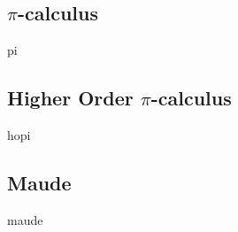 \subsection{\texorpdfstring{$\pi$}{pi}-calculus}
\label{pisyn}
{pi}

\subsection{Higher Order \texorpdfstring{$\pi$}{pi}-calculus}
\label{hopisyn}
{hopi}

\subsection{Maude}
\label{minmaude}
{maude}


